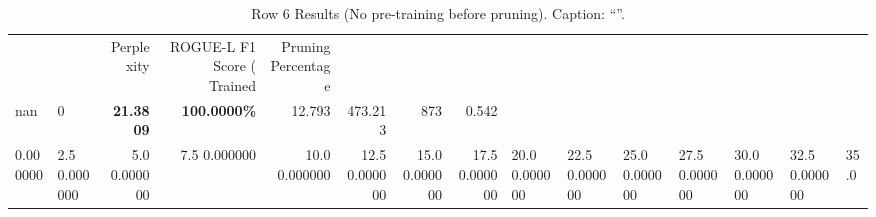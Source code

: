 \begin{table}
\caption{Row 6 Results (No pre-training before pruning). \ifshowcaption{}Caption: ``''.\fi}
\label{tab:evaluation-pipeline-6-untrained}
\begin{tabular}{llrrrrrr}
 &  & Perplexity & ROGUE-L F1 Score (%
Trained & Pruning Percentage &  &  &  &  &  &  \\
nan & 0 & \bfseries 21.3809 & \bfseries 100.0000\% & 12.793 & 473.213 & 873 & 0.542 \\
0.000000 & 2.5%
0.000000 & 5.0%
0.000000 & 7.5%
0.000000 & 10.0%
0.000000 & 12.5%
0.000000 & 15.0%
0.000000 & 17.5%
0.000000 & 20.0%
0.000000 & 22.5%
0.000000 & 25.0%
0.000000 & 27.5%
0.000000 & 30.0%
0.000000 & 32.5%
0.000000 & 35.0%

\end{tabular}
\end{table}

